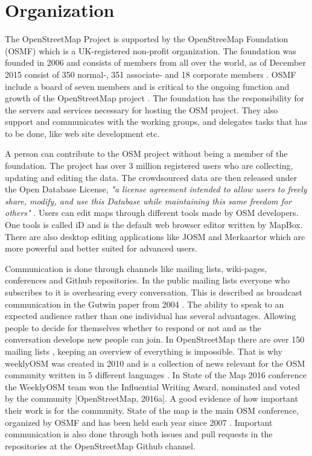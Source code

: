 \section{Organization}
The OpenStreetMap Project is supported by the OpenStreeMap Foundation (OSMF) which is a UK-registered non-profit organization. The foundation was founded in 2006 and consists of members from all over the world, as of December 2015 consist of 350 normal-, 351 associate- and 18 corporate members \cite{OSMF2015}. OSMF include a board of seven members and is critical to the ongoing function and growth of the OpenStreetMap project \cite{OSMF}.  The foundation has the responsibility for the servers and services necessary for hosting the OSM project. They also support and communicates with the working groups, and delegates tasks that has to be done, like web site development etc. 

A person can contribute to the OSM project without being a member of the foundation. The project has over 3 million registered users \cite{OSMProject2016} who are collecting, updating and editing the data. The crowdsourced data are then released under the Open Database License, \textit{"a license agreement intended to allow users to freely share, modify, and use this Database while maintaining this same freedom for others"} \cite{ODbL}.  Users can edit maps through different tools made by OSM developers. One tools is called iD and is the default web browser editor written by MapBox. There are also desktop editing applications like JOSM and Merkaartor which are more powerful and better suited for advanced users. 

Communication is done through channels like mailing lists, wiki-pages, conferences and Github repositories. In the public mailing lists everyone who subscribes to it is overhearing every conversation. This is described as broadcast communication in the Gutwin paper from 2004 \cite{Gutwin2004}. The ability to speak to an expected audience rather than one individual has several advantages. Allowing people to decide for themselves whether to respond or not and as the conversation develops new people can join. In OpenStreetMap there are over 150 mailing lists \cite{Reiter2016}, keeping an overview of everything is impossible. That is why weeklyOSM was created in 2010 and is a collection of news relevant for the OSM community written in 5 different languages \cite{Freyfogle2016}.  In State of the Map 2016 conference the WeeklyOSM team won the Influential Writing Award, nominated and voted by the community [OpenStreetMap, 2016a]. A good evidence of how important their work is for the community. State of the map is the main OSM conference, organized by OSMF and has been held each year since 2007 \cite{OpenStreetMapj}. Important communication is also done through both issues and pull requests in the repositories at the OpenStreetMap Github channel. 

